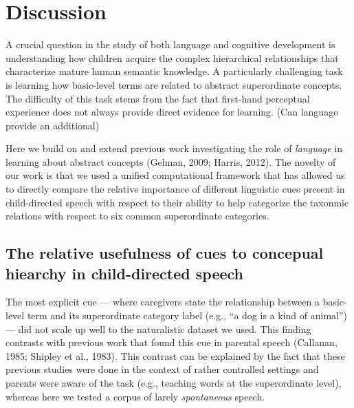 \documentclass[english,,man]{apa6}
\begin{document}
\hypertarget{discussion}{%
\section{Discussion}\label{discussion}}

A crucial question in the study of both language and cognitive development is understanding how children acquire the complex hierarchical relationships that characterize mature human semantic knowledge. A particularly challenging task is learning how basic-level terms are related to abstract superordinate concepts. The difficulty of this task stems from the fact that first-hand perceptual experience does not always provide direct evidence for learning. (Can language provide an additional)

Here we build on and extend previous work investigating the role of \emph{language} in learning about abstract concepts (Gelman, 2009; Harris, 2012). The novelty of our work is that we used a unified computational framework that has allowed us to directly compare the relative importance of different linguistic cues present in child-directed speech with respect to their ability to help categorize the taxonmic relations with respect to six common superordinate categories.

\hypertarget{the-relative-usefulness-of-cues-to-concepual-hiearchy-in-child-directed-speech}{%
\subsection{The relative usefulness of cues to concepual hiearchy in child-directed speech}\label{the-relative-usefulness-of-cues-to-concepual-hiearchy-in-child-directed-speech}}

The most explicit cue --- where caregivers state the relationship between a basic-level term and its superordinate category label (e.g., \enquote{a dog is a kind of animal}) --- did not scale up well to the naturalistic dataset we used. This finding contrasts with previous work that found this cue in parental speech (Callanan, 1985; Shipley et al., 1983). This contrast can be explained by the fact that these previous studies were done in the context of rather controlled settings and parents were aware of the task (e.g., teaching words at the superordinate level), whereas here we tested a corpus of larely \emph{spontaneous} speech.
\end{document}
